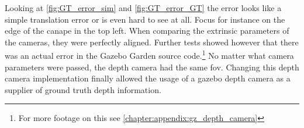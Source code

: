 \clearpage %

Looking at \cref{fig:GT_error_sim} and \cref{fig:GT_error_GT} the error looks like a simple translation error or is even hard to see at all. Focus for instance on the edge of the canape in the top left. When comparing the extrinsic parameters of the cameras, they were perfectly aligned. Further tests showed however that there was an actual error in the Gazebo Garden source code.\footnote[1]{For more footage on this see \cref{chapter:appendix:gz_depth_camera}} No matter what camera parameters were passed, the depth camera had the same fov. Changing this depth camera implementation finally allowed the usage of a gazebo depth camera as a supplier of ground truth depth information.




